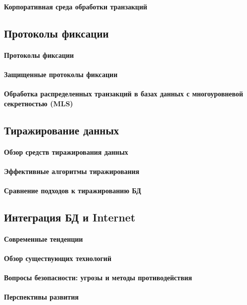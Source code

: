 \paragraph{Корпоративная среда обработки транзакций}

\subsection{Протоколы фиксации}
\paragraph{Протоколы фиксации}
\paragraph{Защищенные протоколы фиксации}
\paragraph{Обработка распределенных транзакций в базах данных с многоуровневой секретностью (MLS)}

\subsection{Тиражирование данных}
\paragraph{Обзор средств тиражирования данных}
\paragraph{Эффективные алгоритмы тиражирования}
\paragraph{Сравнение подходов к тиражированию БД}

\subsection{Интеграция БД и Internet}
\paragraph{Современные тенденции}
\paragraph{Обзор существующих технологий}
\paragraph{Вопросы безопасности: угрозы и методы противодействия}
\paragraph{Перспективы развития}